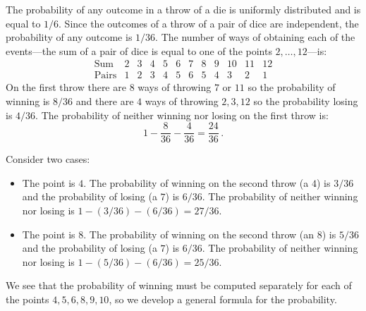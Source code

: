 
 The probability of any outcome in a throw of a die is uniformly distributed and is equal to $1/6$. Since the outcomes of a throw of a pair of dice are independent, the probability of any outcome is $1/36$. The number of ways of obtaining each of the events---the sum of a pair of dice is equal to one of the points $2,\ldots,12$---is:
\[
\begin{array}{l|rrrrrrrrrrr}
\textrm{Sum} & 2 & 3 & 4 & 5 & 6 & 7 & 8 & 9 & 10 & 11 & 12\\\hline
\textrm{Pairs} & 1 & 2 & 3 & 4 & 5 & 6 & 5 & 4 & 3 & 2 & 1
\end{array}
\]
On the first throw there are $8$ ways of throwing $7$ or $11$ so the probability of winning is $8/36$ and there are $4$ ways of throwing $2,3,12$ so the probability losing is $4/36$. The probability of neither winning nor losing on the first throw is:
\[
1 - \frac{8}{36} - \frac{4}{36} = \frac{24}{36}\,.
\]

Consider two cases:
\begin{itemize}
\item The point is $4$. The probability of winning on the second throw (a $4$) is $3/36$ and the probability of losing (a $7$) is $6/36$. The probability of neither winning nor losing is $1-(3/36)-(6/36)=27/36$.
\item The point is $8$. The probability of winning on the second throw (an $8$) is $5/36$ and the probability of losing (a $7$) is $6/36$. The probability of neither winning nor losing is $1-(5/36)-(6/36)=25/36$.
\end{itemize}
We see that the probability of winning must be computed separately for each of the points $4,5,6,8,9,10$, so we develop a general formula for the probability.

